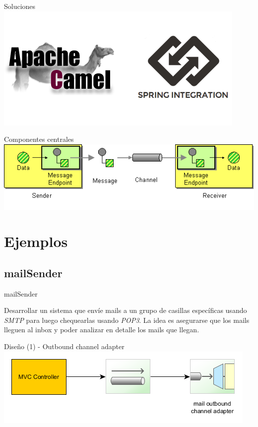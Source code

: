 \documentclass{beamer}
\begin{document}
\begin{frame}{Soluciones}
\includegraphics[width= 0.9\linewidth]{camel-spring}
\end{frame}

\begin{frame}{Componentes centrales}
\includegraphics[width=1.0\linewidth]{MessageEndpointSolution}
\end{frame}

\section{Ejemplos}
\subsection{mailSender}

\begin{frame}
\begin{center}
{\Large mailSender}
\end{center}
Desarrollar un sistema que envíe mails a un grupo de casillas específicas usando \textit{SMTP} para luego chequearlas usando \textit{POP3}. La idea es asegurarse que los mails lleguen al inbox y poder analizar en detalle los mails que llegan.
\end{frame}

\begin{frame}{Diseño (1) - Outbound channel adapter}
\includegraphics[width=1.0\linewidth]{sp-int-01}
\end{frame}
\end{document}
